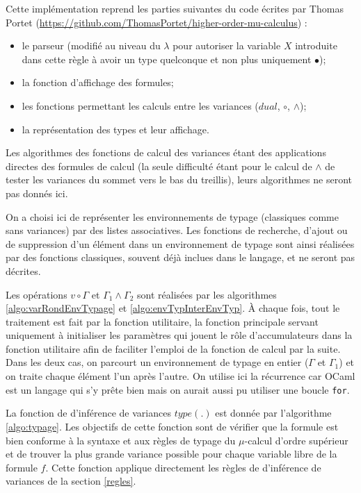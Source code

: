 \documentclass{rapport}
\theoremstyle{plain}
\theoremstyle{remark}
\theoremstyle{definition}
\begin{document}
Cette implémentation reprend les parties suivantes du code écrites par Thomas Portet (\url{https://github.com/ThomasPortet/higher-order-mu-calculus}) :
\begin{itemize}
	\item le parseur (modifié au niveau du $\lambda$ pour autoriser la variable $X$ introduite dans cette règle à avoir un type quelconque et non plus uniquement $\bullet$);
	\item la fonction d'affichage des formules;
	\item les fonctions permettant les calculs entre les variances ($dual$, $\circ$, $\wedge$);
	\item la représentation des types et leur affichage.
\end{itemize} 

Les algorithmes des fonctions de calcul des variances étant des applications directes des formules de calcul (la seule difficulté étant pour le calcul de $\wedge$ de tester les variances du sommet vers le bas du treillis), leurs algorithmes ne seront pas donnés ici. 

On a choisi ici de représenter les environnements de typage (classiques comme sans variances) par des listes associatives. Les fonctions de recherche, d'ajout ou de suppression d'un élément dans un environnement de typage sont ainsi réalisées par des fonctions classiques, souvent déjà inclues dans le langage, et ne seront pas décrites. 

Les opérations $v \circ \Gamma$ et $\Gamma_1 \wedge \Gamma_2$ sont réalisées par les algorithmes \ref{algo:varRondEnvTypage} et \ref{algo:envTypInterEnvTyp}. À chaque fois, tout le traitement est fait par la fonction utilitaire, la fonction principale servant uniquement à initialiser les paramètres qui jouent le rôle d'accumulateurs dans la fonction utilitaire afin de faciliter l'emploi de la fonction de calcul par la suite. Dans les deux cas, on parcourt un environnement de typage en entier ($\Gamma$ et $\Gamma_1$) et on traite chaque élément l'un après l'autre. On utilise ici la récurrence car OCaml est un langage qui s'y prête bien mais on aurait aussi pu utiliser une boucle \texttt{for}.

La fonction de d'inférence de variances $type(.)$ est donnée par l'algorithme \ref{algo:typage}. Les objectifs de cette fonction sont de vérifier que la formule est bien conforme à la syntaxe et aux règles de typage du $\mu$-calcul d'ordre supérieur et de trouver la plus grande variance possible pour chaque variable libre de la formule $f$. Cette fonction applique directement les règles de d'inférence de variances de la section \ref{regles}. 
\end{document}

